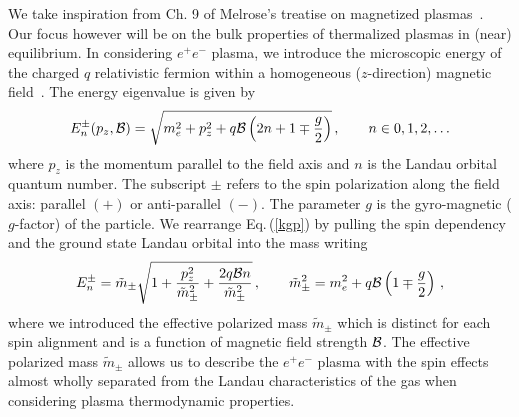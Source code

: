 \documentclass[a4paper]{article}
\newcommand{\req}[1]{Eq.\,(\ref{#1})}
\begin{document}
We take inspiration from Ch. 9 of Melrose's treatise on magnetized plasmas~\cite{melrose2008quantum}. Our focus however will be on the bulk properties of thermalized plasmas in (near) equilibrium. In considering $e^{+}e^{-}$ plasma, we introduce the microscopic energy of the charged $q$ relativistic fermion within a homogeneous ($z$-direction) magnetic field~\cite{steinmetz2018magnetic}. The energy eigenvalue is given by
\begin{align}
    \label{kgp}
    E^{\pm}_{n}(p_{z},{\cal B})=\sqrt{m_{e}^{2}+p_{z}^{2}+q{\cal B}\left(2n+1\mp\frac{g}{2}\right)}\,,\qquad n\in0,1,2,\ldots
\end{align}
where $p_{z}$ is the momentum parallel to the field axis and $n$ is the Landau orbital quantum number. The subscript $\pm$ refers to the spin polarization along the field axis: parallel $(+)$ or anti-parallel $(-)$. The parameter $g$ is the gyro-magnetic ($g$-factor) of the particle. We rearrange \req{kgp} by pulling the spin dependency and the ground state Landau orbital into the mass writing
\begin{align}
    \label{effmass}
    E^{\pm}_{n}={\tilde m}_{\pm}\sqrt{1+\frac{p_{z}^{2}}{{\tilde m}_{\pm}^{2}}+\frac{2q{\cal B}n}{{\tilde m}_{\pm}^{2}}}\,,\qquad {\tilde m}_{\pm}^{2}=m_{e}^{2}+q{\cal B}\left(1\mp\frac{g}{2}\right)\,,
\end{align}
where we introduced the effective polarized mass ${\tilde m}_{\pm}$ which is distinct for each spin alignment and is a function of magnetic field strength ${\cal B}$. The effective polarized mass ${\tilde m}_{\pm}$ allows us to describe the $e^{+}e^{-}$ plasma with the spin effects almost wholly separated from the Landau characteristics of the gas when considering plasma thermodynamic properties.

\end{document}
